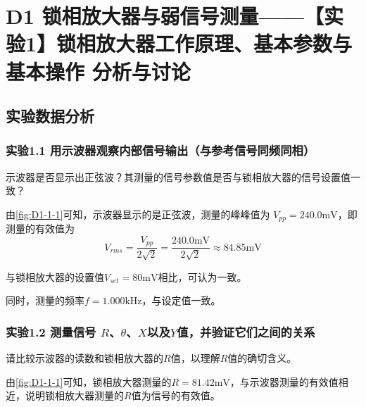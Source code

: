 \documentclass[dvipsnames, svgnames,a4paper,11pt]{article}
\begin{document}
\section{D1 \quad 锁相放大器与弱信号测量——【实验1】锁相放大器工作原理、基本参数与基本操作 \quad\heiti 分析与讨论}

\subsection{实验数据分析}


	\subsubsection*{实验1.1 \quad 用示波器观察内部信号输出（与参考信号同频同相）}
		
		\begin{tcolorbox}[colback=yellow!20, colframe=black!75, title=【问题 1】]
			示波器是否显示出正弦波？其测量的信号参数值是否与锁相放大器的信号设置值一致？
		\end{tcolorbox}

		由\cref{fig:D1-1-1}可知，示波器显示的是正弦波，测量的峰峰值为 $V_{pp} = 240.0 \mathrm{mV}$，即测量的有效值为
		\[
			V_{rms} = \frac{V_{pp}}{2 \sqrt{2}} = \frac{240.0 \mathrm{mV}}{2 \sqrt{2}} \approx 84.85 \mathrm{mV}
		\]

		与锁相放大器的设置值$V_{set} = 80 \mathrm{mV}$相比，可认为一致。

		同时，测量的频率$f = 1.000 \mathrm{kHz}$，与设定值一致。




	\subsubsection*{实验1.2 \quad 测量信号 $R$、$\theta$、$X$以及$Y$值，并验证它们之间的关系}


		\begin{tcolorbox}[colback=yellow!20, colframe=black!75, title=【问题 2】]
			请比较示波器的读数和锁相放大器的$R$值，以理解$R$值的确切含义。
		\end{tcolorbox}

		由\cref{fig:D1-1-1}可知，锁相放大器测量的$R = 81.42 \mathrm{mV}$，与示波器测量的有效值相近，说明锁相放大器测量的$R$值为信号的有效值。


		\vspace{0.05\textwidth} %
\end{document}
